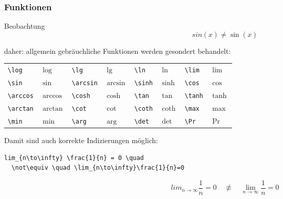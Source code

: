 \begin{frame}[fragile]
  \frametitle{Funktionen}

  \onslide<+->

  \begin{block}{Beobachtung}
    \vspace*{-\baselineskip}
    \begin{equation*}
      sin(x) \neq \sin(x)
    \end{equation*}
  \end{block}

  \onslide<+->

  daher: allgemein gebräuchliche Funktionen werden gesondert behandelt:

  \smallskip

  \begin{center}
    \begin{tabular}{ll|ll|ll|ll}
      \toprule
      \lstinline{\log} & $\log$ & \lstinline{\lg} & $\lg$ & \lstinline{\ln} & $\ln$ & \lstinline{\lim} & $\lim$ \\
      \lstinline{\sin} & $\sin$ & \lstinline{\arcsin} & $\arcsin$ & \lstinline{\sinh} & $\sinh$ & \lstinline{\cos} & $\cos$ \\
      \lstinline{\arccos} & $\arccos$ & \lstinline{\cosh} & $\cosh$ & \lstinline{\tan} & $\tan$ & \lstinline{\tanh} & $\tanh$ \\
      \lstinline{\arctan} & $\arctan$ & \lstinline{\cot} & $\cot$ & \lstinline{\coth} & $\coth$ & \lstinline{\max} & $\max$ \\
      \lstinline{\min} & $\min$  & \lstinline{\arg} & $\arg$ & \lstinline{\det} & $\det$  & \lstinline{\Pr} & $\Pr$ \\
      \bottomrule
    \end{tabular}
  \end{center}

  \smallskip

  \onslide<+->

  Damit sind auch korrekte Indizierungen möglich:
\begin{lstlisting}
lim_{n\to\infty} \frac{1}{n} = 0 \quad
  \not\equiv \quad \lim_{n\to\infty}\frac{1}{n}=0
\end{lstlisting}
  \begin{equation*}
    lim_{n\to\infty} \frac{1}{n} = 0 \quad \not\equiv \quad \lim_{n\to\infty}\frac{1}{n}=0
  \end{equation*}
\end{frame}

